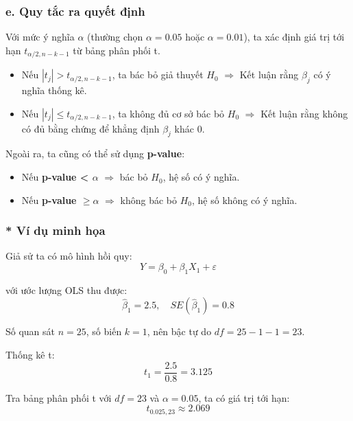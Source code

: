 \subsubsection{e. Quy tắc ra quyết định}

Với mức ý nghĩa $\alpha$ (thường chọn $\alpha = 0.05$ hoặc $\alpha = 0.01$), ta xác định giá trị tới hạn $t_{\alpha/2, n-k-1}$ từ bảng phân phối t.

\begin{itemize}
    \item Nếu $|t_j| > t_{\alpha/2, n-k-1}$, ta bác bỏ giả thuyết $H_0$ $\Rightarrow$ Kết luận rằng $\beta_j$ có ý nghĩa thống kê.
    \item Nếu $|t_j| \leq t_{\alpha/2, n-k-1}$, ta không đủ cơ sở bác bỏ $H_0$ $\Rightarrow$ Kết luận rằng không có đủ bằng chứng để khẳng định $\beta_j$ khác 0.
\end{itemize}

Ngoài ra, ta cũng có thể sử dụng \textbf{p-value}:

\begin{itemize}
    \item Nếu \textbf{p-value < $\alpha$} $\Rightarrow$ bác bỏ $H_0$, hệ số có ý nghĩa.
    \item Nếu \textbf{p-value $\geq \alpha$} $\Rightarrow$ không bác bỏ $H_0$, hệ số không có ý nghĩa.
\end{itemize}

\subsubsection{* Ví dụ minh họa}

Giả sử ta có mô hình hồi quy:
\begin{equation}
    Y = \beta_0 + \beta_1 X_1 + \varepsilon
\end{equation}

với ước lượng OLS thu được:
\begin{equation}
    \hat{\beta}_1 = 2.5, \quad SE(\hat{\beta}_1) = 0.8
\end{equation}

Số quan sát $n = 25$, số biến $k = 1$, nên bậc tự do $df = 25 - 1 - 1 = 23$.

Thống kê t:
\begin{equation}
    t_1 = \frac{2.5}{0.8} = 3.125
\end{equation}

Tra bảng phân phối t với $df = 23$ và $\alpha = 0.05$, ta có giá trị tới hạn:
\begin{equation}
    t_{0.025,23} \approx 2.069
\end{equation}

